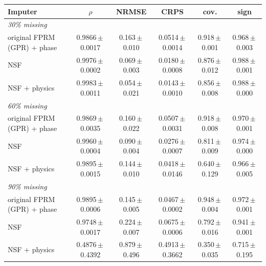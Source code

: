 \begin{tabular}{lccccc}
\toprule
Imputer & $\rho$ & NRMSE & CRPS & cov. & sign\\
\midrule
\multicolumn{6}{l}{\textit{30\% missing}}\\
original FPRM (GPR) + phase & 0.9866\,$\pm$\,0.0017 & 0.163\,$\pm$\,0.010 & 0.0514\,$\pm$\,0.0014 & 0.918\,$\pm$\,0.001 & 0.968\,$\pm$\,0.003\\
NSF & 0.9976\,$\pm$\,0.0002 & 0.069\,$\pm$\,0.003 & 0.0180\,$\pm$\,0.0008 & 0.876\,$\pm$\,0.012 & 0.988\,$\pm$\,0.001\\
NSF + physics & 0.9983\,$\pm$\,0.0011 & 0.054\,$\pm$\,0.021 & 0.0143\,$\pm$\,0.0010 & 0.856\,$\pm$\,0.008 & 0.988\,$\pm$\,0.000\\
\midrule
\multicolumn{6}{l}{\textit{60\% missing}}\\
original FPRM (GPR) + phase & 0.9869\,$\pm$\,0.0035 & 0.160\,$\pm$\,0.022 & 0.0507\,$\pm$\,0.0031 & 0.918\,$\pm$\,0.008 & 0.970\,$\pm$\,0.001\\
NSF & 0.9960\,$\pm$\,0.0004 & 0.090\,$\pm$\,0.004 & 0.0276\,$\pm$\,0.0007 & 0.811\,$\pm$\,0.009 & 0.974\,$\pm$\,0.000\\
NSF + physics & 0.9895\,$\pm$\,0.0015 & 0.144\,$\pm$\,0.010 & 0.0418\,$\pm$\,0.0146 & 0.640\,$\pm$\,0.129 & 0.966\,$\pm$\,0.005\\
\midrule
\multicolumn{6}{l}{\textit{90\% missing}}\\
original FPRM (GPR) + phase & 0.9895\,$\pm$\,0.0006 & 0.145\,$\pm$\,0.005 & 0.0467\,$\pm$\,0.0002 & 0.948\,$\pm$\,0.004 & 0.972\,$\pm$\,0.001\\
NSF & 0.9748\,$\pm$\,0.0017 & 0.224\,$\pm$\,0.007 & 0.0675\,$\pm$\,0.0006 & 0.792\,$\pm$\,0.016 & 0.941\,$\pm$\,0.001\\
NSF + physics & 0.4876\,$\pm$\,0.4392 & 0.879\,$\pm$\,0.496 & 0.4913\,$\pm$\,0.3662 & 0.350\,$\pm$\,0.035 & 0.715\,$\pm$\,0.195\\
\bottomrule
\end{tabular}
